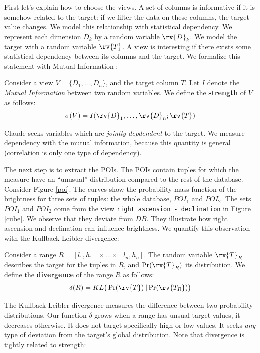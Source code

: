 First let's explain how to choose the views. A set of columns is informative if
it is somehow related to the target: if we filter the data on these columns,
the target value changes.  We model this relationship with statistical
dependency. We represent each  dimension $D_k$ by a random variable $\rv{D}_k$.
We model the target with a random variable $\rv{T}$.  A view is interesting if
there exists some statistical dependency between its columns and the target. We
formalize this statement with Mutual Information \cite{cover2012elements}:

\begin{definition}
Consider a view $V = \{D_1, \ldots, D_n\}$, and the target column $T$.  Let
$I$ denote the \emph{Mutual Information} between two random variables. We
define the \textbf{strength} of $V$ as follows:
\[\sigma(V) = I(\rv{D}_1, \ldots, \rv{D}_n ; \rv{T})\]
\end{definition}

Claude seeks variables which are \emph{jointly depdendent} to the target. We
measure dependency with the mutual information, because this quantity is
general (correlation is only one type of dependency).

The next step is to extract the POIs. The POIs contain tuples for which the
measure have an ``unusual'' distribution compared to the rest of the database.
Consider Figure \ref{poi}. The curves show the probability mass function of the
brightness for three sets of tuples: the whole database, $POI_1$ and $POI_2$.
The sets $POI_1$ and $POI_2$ come from the view \texttt{right ascension -
declination} in Figure \ref{cube}. We observe that they deviate from $DB$.
They illustrate how right ascension and declination can influence brightness.
We quantify this observation with the Kullback-Leibler divergence:

\begin{definition}
Consider a range $R = [l_1, h_1] \times \ldots \times [l_n, h_n]$. 
The random variable $\rv{T}_R$ describes the target for
the tuples in $R$, and $\Pr(\rv{T}_R)$ its distribution.
We define the \textbf{divergence} of the range $R$ as follows: 
\[\delta(R) = KL \big( \Pr(\rv{T}) \| \Pr(\rv{T_R})  \big)\]
\end{definition}

The Kullback-Leibler divergence measures the difference between two probability
distributions. Our function $\delta$ grows when a range has unsual target
values, it decreases otherwise. It does not target specifically high or low
values. It seeks \emph{any} type of deviation from the target's global
distribution.  Note that divergence is tightly related to strength:

